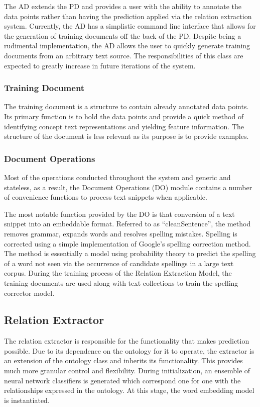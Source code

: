 \documentclass[11pt]{article} %
\begin{document}
The AD extends the PD and provides a user with the ability to annotate the data points rather than having the prediction applied via the relation extraction system. Currently, the AD has a simplistic command line interface that allows for the generation of training documents off the back of the PD. Despite being a rudimental implementation, the AD allows the user to quickly generate training documents from an arbitrary text source. The responsibilities of this class are expected to greatly increase in future iterations of the system.

\subsubsection{Training Document}

The training document is a structure to contain already annotated data points. Its primary function is to hold the data points and provide a quick method of identifying concept text representations and yielding feature information. The structure of the document is less relevant as its purpose is to provide examples. 

\subsubsection{Document Operations}

Most of the operations conducted throughout the system and generic and stateless, as a result, the Document Operations (DO) module contains a number of convenience functions to process text snippets when applicable.

The most notable function provided by the DO is that conversion of a text snippet into an embeddable format. Referred to as “cleanSentence”, the method removes grammar, expands words and resolves spelling mistakes. Spelling is corrected using a simple implementation of Google’s spelling correction method. The method is essentially a model using probability theory to predict the spelling of a word not seen via the occurrence of candidate spellings in a large text corpus. During the training process of the Relation Extraction Model, the training documents are used along with text collections to train the spelling corrector model.

\subsection{Relation Extractor}

The relation extractor is responsible for the functionality that makes prediction possible. Due to its dependence on the ontology for it to operate, the extractor is an extension of the ontology class and inherits its functionality. This provides much more granular control and flexibility. During initialization, an ensemble of neural network classifiers is generated which correspond one for one with the relationships expressed in the ontology. At this stage, the word embedding model is instantiated.
\end{document}
